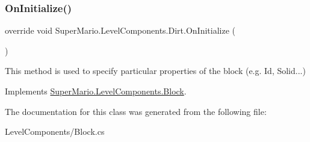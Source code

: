 \subsubsection{\texorpdfstring{On\+Initialize()}{OnInitialize()}}
{\footnotesize\ttfamily override void Super\+Mario.\+Level\+Components.\+Dirt.\+On\+Initialize (\begin{DoxyParamCaption}{ }\end{DoxyParamCaption})\hspace{0.3cm}{\ttfamily [virtual]}}



This method is used to specify particular properties of the block (e.\+g. Id, Solid...) 



Implements \mbox{\hyperlink{class_super_mario_1_1_level_components_1_1_block_aecd2a6fa80ecbd7dd5cec2cdf4b149ec}{Super\+Mario.\+Level\+Components.\+Block}}.



The documentation for this class was generated from the following file\+:\begin{DoxyCompactItemize}
\item 
Level\+Components/Block.\+cs\end{DoxyCompactItemize}
